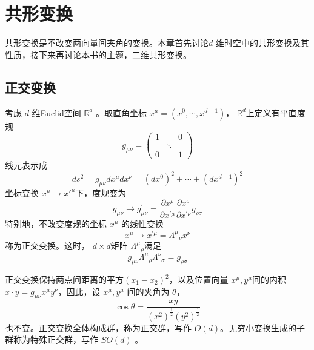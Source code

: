 \chapter{共形变换}

共形变换是不改变两向量间夹角的变换。本章首先讨论$ d$ 维时空中的共形变换及其性质，接下来再讨论本书的主题，二维共形变换。

\section{正交变换}
考虑 $d$ 维Euclid空间 $\mathbb{R}^d$ 。取直角坐标 $x^{\mu}=\left(x^{0}, \cdots, x^{d-1}\right) $， $\mathbb{R}^d $上定义有平直度规
\begin{equation}
	g_{\mu \nu}=\left(\begin{array}{ccc} 1 & & 0 \\ & \ddots & \\ 0 & & 1 \end{array}\right)
\end{equation}
线元表示成
\begin{equation}
	d s^{2}=g_{\mu \nu} d x^{\mu} d x^{\nu}=\left(d x^{0}\right)^{2}+\cdots+\left(d x^{d-1}\right)^{2}
\end{equation}
坐标变换 $x^\mu \to x'^\mu $下，度规变为
\begin{equation}
		g_{\mu \nu} \rightarrow g_{\mu \nu}^{\prime}=\frac{\partial x^{\rho}}{\partial x^{\prime \mu}} \frac{\partial x^{\sigma}}{\partial x^{\prime \nu}} g_{\rho \sigma}
\end{equation}
特别地，不改变度规的坐标 $x^\mu$ 的线性变换
\begin{equation}
	x^{\mu} \rightarrow x^{\prime \mu}=\Lambda^{\mu} {}_{\nu}x^{\nu}
\end{equation}
称为正交变换。这时， $d\times d $矩阵 $\Lambda^\mu{}_\rho $满足
\begin{equation}
	g_{\mu\nu}\Lambda^\mu{}_\rho \Lambda^\nu{}_\sigma=g_{\rho\sigma}
\end{equation}

正交变换保持两点间距离的平方$ (x_1-x_2)^2$，以及位置向量 $x^\mu,y^\mu $间的内积 $x\cdot y=g_{\mu \nu} x^{\mu} y^{\nu} $，因此，设 $x^\mu,y^\mu$ 间的夹角为 $\theta $，
\begin{equation}
	\cos \theta=\frac{x y}{\left(x^{2}\right)^{\frac{1}{2}}\left(y^{2}\right)^{\frac{1}{2}}}
\end{equation}
也不变。正交变换全体构成群，称为正交群，写作 $O(d) $。无穷小变换生成的子群称为特殊正交群，写作 $SO(d)$ 。

